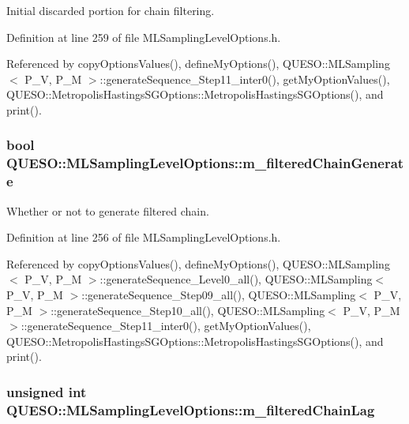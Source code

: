Initial discarded portion for chain filtering. 



Definition at line 259 of file M\-L\-Sampling\-Level\-Options.\-h.



Referenced by copy\-Options\-Values(), define\-My\-Options(), Q\-U\-E\-S\-O\-::\-M\-L\-Sampling$<$ P\-\_\-\-V, P\-\_\-\-M $>$\-::generate\-Sequence\-\_\-\-Step11\-\_\-inter0(), get\-My\-Option\-Values(), Q\-U\-E\-S\-O\-::\-Metropolis\-Hastings\-S\-G\-Options\-::\-Metropolis\-Hastings\-S\-G\-Options(), and print().

\hypertarget{class_q_u_e_s_o_1_1_m_l_sampling_level_options_a878542ef3504c843b50e0bd5efd0c078}{
\subsubsection[{m\-\_\-filtered\-Chain\-Generate}]{\setlength{\rightskip}{0pt plus 5cm}bool Q\-U\-E\-S\-O\-::\-M\-L\-Sampling\-Level\-Options\-::m\-\_\-filtered\-Chain\-Generate}}\label{class_q_u_e_s_o_1_1_m_l_sampling_level_options_a878542ef3504c843b50e0bd5efd0c078}


Whether or not to generate filtered chain. 



Definition at line 256 of file M\-L\-Sampling\-Level\-Options.\-h.



Referenced by copy\-Options\-Values(), define\-My\-Options(), Q\-U\-E\-S\-O\-::\-M\-L\-Sampling$<$ P\-\_\-\-V, P\-\_\-\-M $>$\-::generate\-Sequence\-\_\-\-Level0\-\_\-all(), Q\-U\-E\-S\-O\-::\-M\-L\-Sampling$<$ P\-\_\-\-V, P\-\_\-\-M $>$\-::generate\-Sequence\-\_\-\-Step09\-\_\-all(), Q\-U\-E\-S\-O\-::\-M\-L\-Sampling$<$ P\-\_\-\-V, P\-\_\-\-M $>$\-::generate\-Sequence\-\_\-\-Step10\-\_\-all(), Q\-U\-E\-S\-O\-::\-M\-L\-Sampling$<$ P\-\_\-\-V, P\-\_\-\-M $>$\-::generate\-Sequence\-\_\-\-Step11\-\_\-inter0(), get\-My\-Option\-Values(), Q\-U\-E\-S\-O\-::\-Metropolis\-Hastings\-S\-G\-Options\-::\-Metropolis\-Hastings\-S\-G\-Options(), and print().

\hypertarget{class_q_u_e_s_o_1_1_m_l_sampling_level_options_a6740efa52d4f8ec112be817f5220cf94}{
\subsubsection[{m\-\_\-filtered\-Chain\-Lag}]{\setlength{\rightskip}{0pt plus 5cm}unsigned int Q\-U\-E\-S\-O\-::\-M\-L\-Sampling\-Level\-Options\-::m\-\_\-filtered\-Chain\-Lag}}\label{class_q_u_e_s_o_1_1_m_l_sampling_level_options_a6740efa52d4f8ec112be817f5220cf94}


